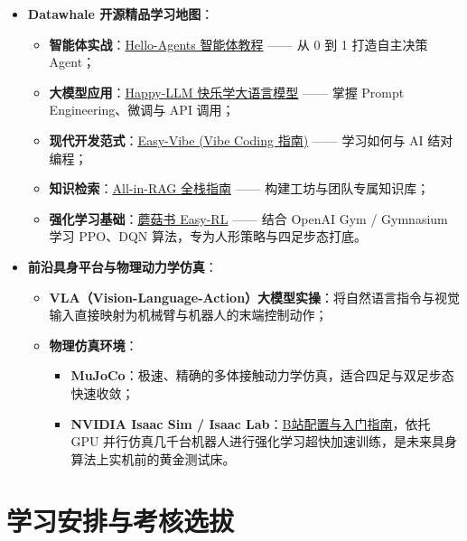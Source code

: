 \documentclass[a4paper,11pt,oneside]{scrreprt}
\begin{document}
\begin{itemize}
    \item \textbf{Datawhale 开源精品学习地图}：
    \begin{itemize}
        \item \textbf{智能体实战}：\href{https://github.com/datawhalechina/hello-agents}{\underline{Hello-Agents 智能体教程}} —— 从 0 到 1 打造自主决策 Agent；
        \item \textbf{大模型应用}：\href{https://github.com/datawhalechina/happy-llm}{\underline{Happy-LLM 快乐学大语言模型}} —— 掌握 Prompt Engineering、微调与 API 调用；
        \item \textbf{现代开发范式}：\href{https://github.com/datawhalechina/easy-vibe}{\underline{Easy-Vibe (Vibe Coding 指南)}} —— 学习如何与 AI 结对编程；
        \item \textbf{知识检索}：\href{https://github.com/datawhalechina/all-in-rag}{\underline{All-in-RAG 全栈指南}} —— 构建工坊与团队专属知识库；
        \item \textbf{强化学习基础}：\href{https://github.com/datawhalechina/easy-rl}{\underline{蘑菇书 Easy-RL}} —— 结合 OpenAI Gym / Gymnasium 学习 PPO、DQN 算法，专为人形策略与四足步态打底。
    \end{itemize}
    \item \textbf{前沿具身平台与物理动力学仿真}：
    \begin{itemize}
        \item \textbf{VLA（Vision-Language-Action）大模型实操}：将自然语言指令与视觉输入直接映射为机械臂与机器人的末端控制动作；
        \item \textbf{物理仿真环境}：
        \begin{itemize}
            \item \textbf{MuJoCo}：极速、精确的多体接触动力学仿真，适合四足与双足步态快速收敛；
            \item \textbf{NVIDIA Isaac Sim / Isaac Lab}：\href{https://www.bilibili.com/video/BV1X1RZYfE7Z/}{\underline{B站配置与入门指南}}，依托 GPU 并行仿真几千台机器人进行强化学习超快加速训练，是未来具身算法上实机前的黄金测试床。
        \end{itemize}
    \end{itemize}
\end{itemize}

\chapter{学习安排与考核选拔}
\end{document}
